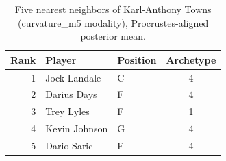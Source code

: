 \begin{table}[htbp]
  \centering\small
  \begin{tabular}{rllc}
    \toprule
    Rank & Player & Position & Archetype \\
    \midrule
    1 & Jock Landale & C & 4 \\
    2 & Darius Days & F & 4 \\
    3 & Trey Lyles & F & 1 \\
    4 & Kevin Johnson & G & 4 \\
    5 & Dario Saric & F & 4 \\
    \bottomrule
  \end{tabular}
  \caption{Five nearest neighbors of Karl-Anthony Towns (curvature_m5 modality), Procrustes-aligned posterior mean.}
  \label{tab:Karl_Anthony_Towns_neighbors_curvature_m5}
\end{table}

